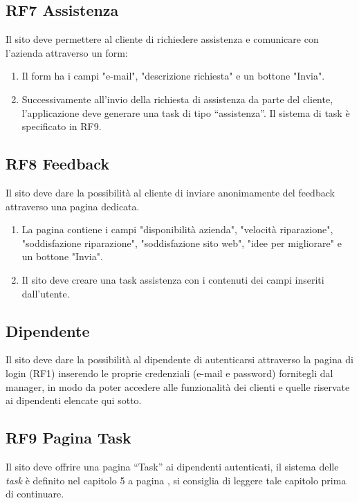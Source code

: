 \documentclass{report}
\begin{document}
\subsection*{RF7 Assistenza}
Il sito deve permettere al cliente di richiedere assistenza e comunicare con l'azienda attraverso un form:

\begin{enumerate}
	\item Il form ha i campi "e-mail", "descrizione richiesta" e un bottone "Invia".
	
	\item Successivamente all’invio della richiesta di assistenza da parte del cliente, l’applicazione deve generare una task di tipo “assistenza”. Il sistema di task è specificato in RF9.
	
	
\end{enumerate}

\subsection*{RF8 Feedback}
Il sito deve dare la possibilità al cliente di inviare anonimamente del feedback attraverso una pagina dedicata.
\begin{enumerate}
	\item La pagina contiene i campi "disponibilità azienda", "velocità riparazione", "soddisfazione riparazione", "soddisfazione sito web", "idee per migliorare" e un bottone "Invia".

	\item Il sito deve creare una task assistenza con i contenuti dei campi inseriti dall'utente.

	
\end{enumerate}

\subsection{Dipendente}
Il sito deve dare la possibilità al dipendente di autenticarsi attraverso la pagina di login (RF1) inserendo le proprie credenziali (e-mail e password) fornitegli dal manager, in modo da poter accedere alle funzionalità dei clienti  e quelle riservate ai dipendenti elencate qui sotto.

\subsection*{RF9 Pagina Task}

Il sito deve offrire una pagina “Task” ai dipendenti autenticati, il sistema delle \textit{task} è definito nel capitolo 5 a pagina \pageref{chap:tasks}, si consiglia di leggere tale capitolo prima di continuare.
\end{document}
